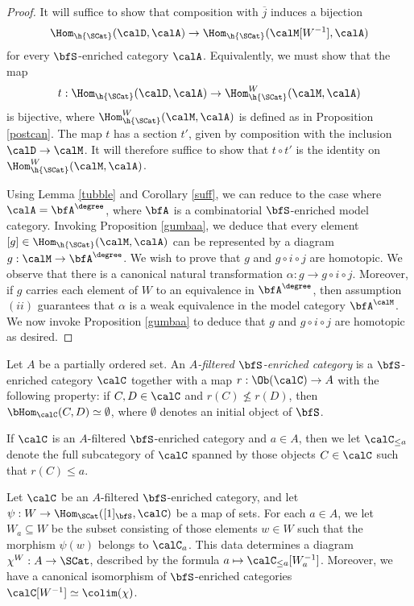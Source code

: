 \begin{Simplicial Categories}
\begin{proof}
It will suffice to show that composition with $\overline{j}$ induces a bijection
$$ \Hom_{ \h{\SCat} }( \calD, \calA) \rightarrow \Hom_{ \h{\SCat}}( \calM[W^{-1}], \calA)$$
for every $\bfS$-enriched category $\calA$. Equivalently, we must show that the map $$t: \Hom_{\h{\SCat}}( \calD, \calA) \rightarrow \Hom^{W}_{\h{\SCat}}(\calM, \calA)$$
is bijective, where $\Hom_{\h{\SCat}}^{W}( \calM, \calA)$ is defined as in Proposition \ref{postcan}.
The map $t$ has a section $t'$, given by composition with the inclusion $\calD \rightarrow \calM$.
It will therefore suffice to show that $t \circ t'$ is the identity on $\Hom_{\h{\SCat}}^{W}(\calM, \calA)$. 

Using Lemma \ref{tubble} and Corollary \ref{suff}, we can reduce to the case where $\calA = \bfA^{\degree}$, where $\bfA$ is a combinatorial $\bfS$-enriched model category. Invoking Proposition \ref{gumbaa}, we deduce that every element $[g] \in \Hom_{\h{\SCat}}( \calM, \calA)$ can be represented
by a diagram $g: \calM \rightarrow \bfA^{\degree}$. We wish to prove that
$g$ and $g \circ i \circ j$ are homotopic. We observe that there is a canonical natural transformation $\alpha: g \rightarrow g \circ i \circ j$. Moreover, if $g$ carries
each element of $W$ to an equivalence in $\bfA^{\degree}$, then assumption
$(ii)$ guarantees that $\alpha$ is a weak equivalence in the model category $\bfA^{\calM}$. We now invoke Proposition \ref{gumbaa} to deduce that $g$ and $g \circ i \circ j$ are homotopic as desired.
\end{proof}

\begin{definition}
Let $A$ be a partially ordered set. An {\it $A$-filtered $\bfS$-enriched category}
is a $\bfS$-enriched category $\calC$ together with a map $r: \Ob(\calC) \rightarrow A$
with the following property: if $C, D \in \calC$ and $r(C) \nleq r(D)$, then
$\bHom_{\calC}(C,D) \simeq \emptyset$, where $\emptyset$ denotes an initial object of $\bfS$.

If $\calC$ is an $A$-filtered $\bfS$-enriched category and $a \in A$, then we let
$\calC_{\leq a}$ denote the full subcategory of $\calC$ spanned by those objects
$C \in \calC$ such that $r(C) \leq a$.
\end{definition}

\begin{remark}\label{sabreton}
Let $\calC$ be an $A$-filtered $\bfS$-enriched category, and let
$\psi: W \rightarrow \Hom_{\SCat}( [1]_{\bfS}, \calC)$ be a map of sets.
For each $a \in A$, we let $W_{a} \subseteq W$ be the subset
consisting of those elements $w \in W$ such that the morphism
$\psi(w)$ belongs to $\calC_{a}$. This data determines a diagram
$\chi^{W}: A \rightarrow \SCat$, described by the formula
$a \mapsto \calC_{\leq a}[ W_{a}^{-1} ]$. Moreover, we have a canonical isomorphism
of $\bfS$-enriched categories $\calC[W^{-1}] \simeq \colim(\chi)$.
\end{remark}


\end{Simplicial Categories}
